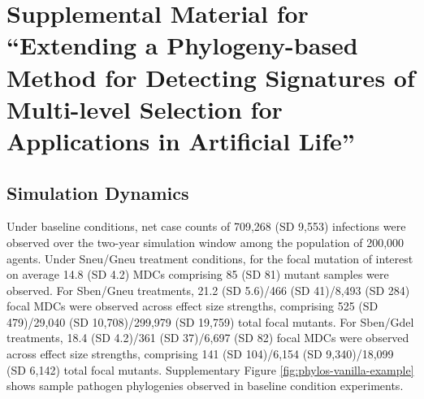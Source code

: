 \appendix
\onecolumn

\section*{\Huge Supplemental Material for ``Extending a Phylogeny-based Method for Detecting Signatures of Multi-level Selection for Applications in Artificial Life''}

\FloatBarrier

\setcounter{section}{0}

\makeatletter
\def\@seccntformat#1{\@ifundefined{#1@cntformat}%
   {\csname the#1\endcsname\space}%
   {\csname #1@cntformat\endcsname}}%
\newcommand\section@cntformat{\thesection.\space} %
\makeatother
\renewcommand{\thesection}{S\arabic{section}}









\subsection{Simulation Dynamics}

Under baseline conditions, net case counts of 709,268 (SD 9,553) infections were observed over the two-year simulation window among the population of 200,000 agents.
Under Sneu/Gneu treatment conditions, for the focal mutation of interest on average 14.8 (SD 4.2) MDCs comprising 85 (SD 81) mutant samples were observed.
For Sben/Gneu treatments, 21.2 (SD 5.6)/466 (SD 41)/8,493 (SD 284) focal MDCs were observed across effect size strengths, comprising 525 (SD 479)/29,040 (SD 10,708)/299,979 (SD 19,759) total focal mutants.
For Sben/Gdel treatments, 18.4 (SD 4.2)/361 (SD 37)/6,697 (SD 82) focal MDCs were observed across effect size strengths, comprising 141 (SD 104)/6,154 (SD 9,340)/18,099 (SD 6,142) total focal mutants.
Supplementary Figure \ref{fig:phylos-vanilla-example} shows sample pathogen phylogenies observed in baseline condition experiments.


